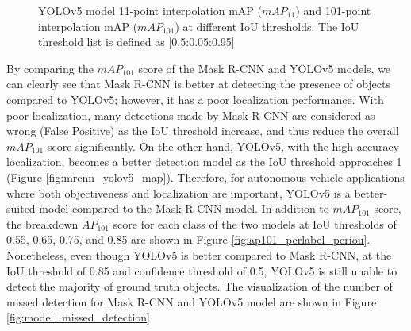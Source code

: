 \begin{figure}[!ht]
    \centering
    \quad
    \caption{YOLOv5 model 11-point interpolation mAP ($mAP_{11}$) and 101-point interpolation mAP ($mAP_{101}$) at different IoU thresholds. The IoU threshold list is defined as [0.5:0.05:0.95]}  \label{fig:yolov5_map}
\end{figure}

By comparing the $mAP_{101}$ score of the Mask R-CNN and YOLOv5 models, we can clearly see that Mask R-CNN is better at detecting the presence of objects compared to YOLOv5; however, it has a poor localization performance. With poor localization, many detections made by Mask R-CNN are considered as wrong (False Positive) as the IoU threshold increase, and thus reduce the overall $mAP_{101}$ score significantly. On the other hand, YOLOv5, with the high accuracy localization, becomes a better detection model as the IoU threshold approaches 1 (Figure \ref{fig:mrcnn_yolov5_map}). Therefore, for autonomous vehicle applications where both objectiveness and localization are important, YOLOv5 is a better-suited model compared to the Mask R-CNN model. In addition to $mAP_{101}$ score, the breakdown $AP_{101}$ score for each class of the two models at IoU thresholds of 0.55, 0.65, 0.75, and 0.85 are shown in Figure \ref{fig:ap101_perlabel_periou}. Nonetheless, even though YOLOv5 is better compared to Mask R-CNN, at the IoU threshold of 0.85 and confidence threshold of 0.5, YOLOv5 is still unable to detect the majority of ground truth objects. The visualization of the number of missed detection for Mask R-CNN and YOLOv5 model are shown in Figure \ref{fig:model_missed_detection}

